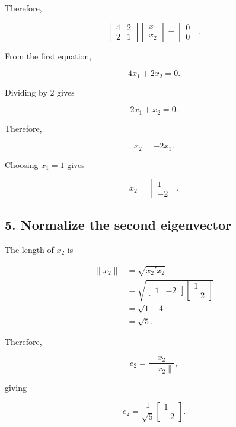 \documentclass[12pt]{article}
\begin{document}
	Therefore,
	
	\[
	\begin{bmatrix}
		4&2\\
		2&1
	\end{bmatrix}
	\begin{bmatrix}
		x_1\\
		x_2
	\end{bmatrix}
	=
	\begin{bmatrix}
		0\\
		0
	\end{bmatrix}.
	\]
	
	From the first equation,
	
	\[
	4x_1+2x_2=0.
	\]
	
	Dividing by $2$ gives
	
	\[
	2x_1+x_2=0.
	\]
	
	Therefore,
	
	\[
	x_2=-2x_1.
	\]
	
	Choosing $x_1=1$ gives
	
	\[
	\boxed{
		x_2=
		\begin{bmatrix}
			1\\
			-2
		\end{bmatrix}
	}.
	\]
	
	\subsection*{5. Normalize the second eigenvector}
	
	The length of $x_2$ is
	
	\[
	\begin{aligned}
		\|x_2\|
		&=\sqrt{x_2'x_2}\\
		&=
		\sqrt{
			\begin{bmatrix}
				1&-2
			\end{bmatrix}
			\begin{bmatrix}
				1\\
				-2
			\end{bmatrix}
		}\\
		&=\sqrt{1+4}\\
		&=\sqrt{5}.
	\end{aligned}
	\]
	
	Therefore,
	
	\[
	e_2=\frac{x_2}{\|x_2\|},
	\]
	
	giving
	
	\[
	\boxed{
		e_2=
		\frac{1}{\sqrt{5}}
		\begin{bmatrix}
			1\\
			-2
		\end{bmatrix}
	}.
	\]
	
\end{document}
